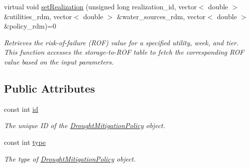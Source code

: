 \begin{DoxyCompactItemize}
virtual void \mbox{\hyperlink{classDroughtMitigationPolicy_a5d2033543cacca1e412eebef5106eab4}{set\+Realization}} (unsigned long realization\+\_\+id, vector$<$ double $>$ \&utilities\+\_\+rdm, vector$<$ double $>$ \&water\+\_\+sources\+\_\+rdm, vector$<$ double $>$ \&policy\+\_\+rdm)=0
\begin{DoxyCompactList}\small\item\em Retrieves the risk-\/of-\/failure (R\+OF) value for a specified utility, week, and tier. This function accesses the storage-\/to-\/\+R\+OF table to fetch the corresponding R\+OF value based on the input parameters. \end{DoxyCompactList}\end{DoxyCompactItemize}
\subsection*{Public Attributes}
\begin{DoxyCompactItemize}
\item 
const int \mbox{\hyperlink{classDroughtMitigationPolicy_abf3ed19ed98e0d74dc9ae24094be640b}{id}}
\begin{DoxyCompactList}\small\item\em The unique ID of the \mbox{\hyperlink{classDroughtMitigationPolicy}{Drought\+Mitigation\+Policy}} object. \end{DoxyCompactList}\item 
const int \mbox{\hyperlink{classDroughtMitigationPolicy_aaea5016d1462bec889cb8df85aececc6}{type}}
\begin{DoxyCompactList}\small\item\em The type of \mbox{\hyperlink{classDroughtMitigationPolicy}{Drought\+Mitigation\+Policy}} object. \end{DoxyCompactList}\end{DoxyCompactItemize}
